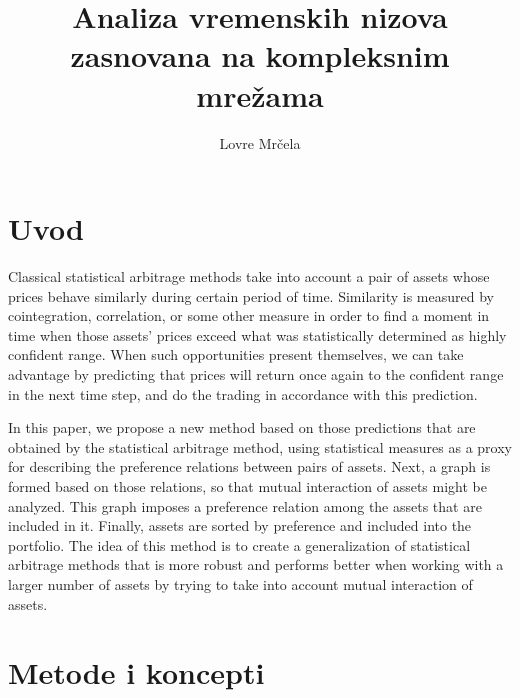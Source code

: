 \documentclass[lmodern, utf8, diplomski]{fer}
\begin{document}

\title{Analiza vremenskih nizova zasnovana na kompleksnim mrežama}

\author{Lovre Mrčela}

\maketitle

\izvornik

\zahvala{}

\tableofcontents

\chapter{Uvod}
  Classical statistical arbitrage methods take into account a pair of assets whose prices behave similarly during certain period of time.
  Similarity is measured by cointegration, correlation, or some other measure in order to find a moment in time when those assets' prices exceed what was statistically determined as highly confident range.
  When such opportunities present themselves, we can take advantage by predicting that prices will return once again to the confident range in the next time step, and do the trading in accordance with this prediction.
  
  In this paper, we propose a new method based on those predictions that are obtained by the statistical arbitrage method, using statistical measures as a proxy for describing the preference relations between pairs of assets.
  Next, a graph is formed based on those relations, so that mutual interaction of assets might be analyzed.
  This graph imposes a preference relation among the assets that are included in it.
  Finally, assets are sorted by preference and included into the portfolio.
  The idea of this method is to create a generalization of statistical arbitrage methods that is more robust and performs better when working with a larger number of assets by trying to take into account mutual interaction of assets.

\chapter{Metode i koncepti}
\end{document}
